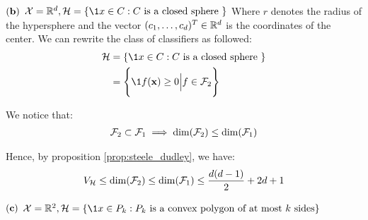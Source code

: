 \begin{solution*}
\begin{subproof}{\newline ${\bf (b)}$ $\X=\R^d, \Hf=\{ \1{x \in C} : C \text{ is a closed sphere }\}$}
        \noindent Where $r$ denotes the radius of the hypersphere and the vector $(c_1, \dots, c_d)^T\in\mathbb{R}^d$ is the coordinates of the center. We can rewrite the class of classifiers as followed:
        \begin{align*}
            \Hf&=\{ \1{x \in C} : C \text{ is a closed sphere }\} \\
            &= \biggCurl{
                \1{f({\bf x}) \ge 0} \Big| f \in \F_2
            }
        \end{align*}

        \noindent We notice that:
        \begin{align*}
            \mathcal{F}_2 \subset \mathcal{F}_1 \implies \dim(\mathcal{F}_2) \le \dim(\mathcal{F}_1)
        \end{align*}

        \noindent Hence, by proposition \ref{prop:steele_dudley}, we have:
        \begin{align*}
            V_{\mathcal{H}} \le \dim(\mathcal{F}_2) \le \dim(\mathcal{F}_1) \le \frac{d(d-1)}{2} + 2d + 1
        \end{align*}
    \end{subproof}

    \begin{subproof}{\newline ${\bf (c)}$ $\X=\R^2, \Hf=\{ \1{x \in P_k} : P_k \text{ is a convex polygon of at most $k$ sides} \}$}
        
    \end{subproof}
\end{solution*}


